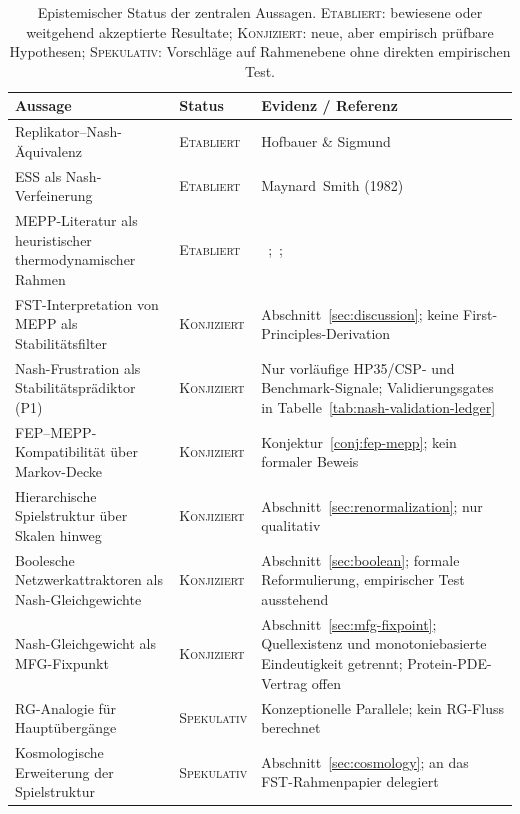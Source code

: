\documentclass[12pt,a4paper]{article}
\theoremstyle{remark}
\begin{document}
\begin{table}[htbp]
\centering
\caption{Epistemischer Status der zentralen Aussagen. \textsc{Etabliert}: bewiesene oder weitgehend akzeptierte Resultate; \textsc{Konjiziert}: neue, aber empirisch prüfbare Hypothesen; \textsc{Spekulativ}: Vorschläge auf Rahmenebene ohne direkten empirischen Test.}
\label{tab:status-claims}
\small
\begin{tabularx}{\textwidth}{@{}L{0.32\textwidth} l Y@{}}
\toprule
\textbf{Aussage} & \textbf{Status} & \textbf{Evidenz / Referenz} \\
\midrule
Replikator--Nash-Äquivalenz & \textsc{Etabliert} & Hofbauer \& Sigmund~\citep{HofbauerSigmund1998} \\
ESS als Nash-Verfeinerung & \textsc{Etabliert} & Maynard~Smith (1982) \\
MEPP-Literatur als heuristischer thermodynamischer Rahmen & \textsc{Etabliert} &~\citet{Martyushev2010};~\citet{Toma2025};~\citet{EcosystemMEPP} \\
FST-Interpretation von MEPP als Stabilitätsfilter & \textsc{Konjiziert} & Abschnitt~\ref{sec:discussion}; keine First-Principles-Derivation \\
Nash-Frustration als Stabilitätsprädiktor (P1) & \textsc{Konjiziert} & Nur vorläufige HP35/CSP- und Benchmark-Signale; Validierungsgates in Tabelle~\ref{tab:nash-validation-ledger} \\
FEP--MEPP-Kompatibilität über Markov-Decke & \textsc{Konjiziert} & Konjektur~\ref{conj:fep-mepp}; kein formaler Beweis \\
Hierarchische Spielstruktur über Skalen hinweg & \textsc{Konjiziert} & Abschnitt~\ref{sec:renormalization}; nur qualitativ \\
Boolesche Netzwerkattraktoren als Nash-Gleichgewichte & \textsc{Konjiziert} & Abschnitt~\ref{sec:boolean}; formale Reformulierung, empirischer Test ausstehend \\
Nash-Gleichgewicht als MFG-Fixpunkt & \textsc{Konjiziert} & Abschnitt~\ref{sec:mfg-fixpoint}; Quellexistenz und monotoniebasierte Eindeutigkeit getrennt; Protein-PDE-Vertrag offen \\
RG-Analogie für Hauptübergänge & \textsc{Spekulativ} & Konzeptionelle Parallele; kein RG-Fluss berechnet \\
Kosmologische Erweiterung der Spielstruktur & \textsc{Spekulativ} & Abschnitt~\ref{sec:cosmology}; an das FST-Rahmenpapier delegiert \\
\bottomrule
\end{tabularx}
\end{table}
\end{document}
